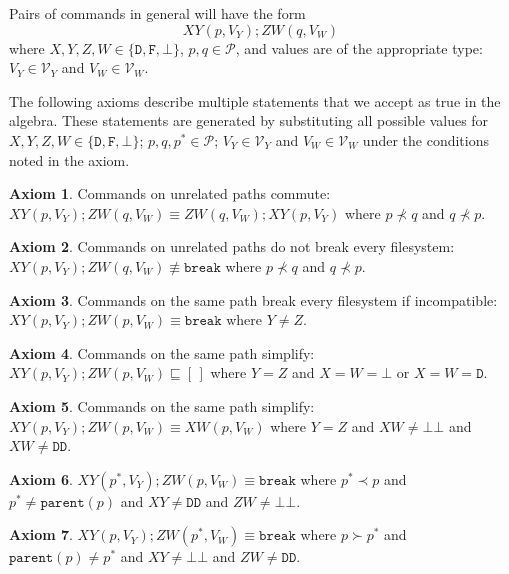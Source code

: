 \documentclass[12pt]{article}
\newcommand{\setvx}[1]{\mathcal{V}_{#1}}
\newcommand{\setp}{\mathcal{P}}
\newcommand{\empt}{\bot}
\newcommand{\parent}{\mathtt{parent}}
\newcommand{\pp}{p^*} %
\newcommand{\cbrk}{\mathtt{break}}
\newcommand{\fscommand}[2]{{#1#2}}
\newcommand{\fsregcommandchar}[1]{\mathtt{#1}}
\newcommand{\fsregcommand}[2]{\fscommand{\fsregcommandchar{#1}}{\fsregcommandchar{#2}}}
\newcommand{\cbb}{\fsregcommand{\empt}{\empt}}
\newcommand{\cdd}{\fsregcommand{D}{D}}
\newcommand{\cxy}{\fscommand{X}{Y}}
\newcommand{\cxw}{\fscommand{X}{W}}
\newcommand{\czw}{\fscommand{Z}{W}}
\newcommand{\typeset}{\{\fsregcommandchar{D},\fsregcommandchar{F},\empt\}}
\newcommand{\descendant}{\prec}
\newcommand{\ancestor}{\succ}
\newcommand{\eqext}{\sqsubseteq}
\newcommand{\nequiv}{\not\equiv}
\newcommand{\emptyseq}{[\,]}
\theoremstyle{definition}
\newtheorem{myax}{Axiom}
\begin{document}
Pairs of commands in general will have the form
\[ \cxy(p,V_Y); \czw(q,V_W) \]
where $X,Y,Z,W\in\typeset$, $p,q\in\setp$, 
and values are of the appropriate type: 
$V_Y\in\setvx{Y}$ and $V_W\in\setvx{W}$.

The following axioms describe multiple statements
that we accept as true in the algebra.
These statements are generated by substituting 
all possible values for
$X,Y,Z,W\in\typeset$; $p,q,\pp\in\setp$; $V_Y\in\setvx{Y}$ and $V_W\in\setvx{W}$
under the conditions noted in the axiom.


\begin{myax}\label{ax_separate_commute}
Commands on unrelated paths commute:
$\cxy(p,V_Y); \czw(q,V_W) \equiv \czw(q,V_W); \cxy(p,V_Y)$ where $p\not\descendant q$ and $q\not\descendant p$.
\end{myax}

\begin{myax}\label{ax_separate_nobreaks}
Commands on unrelated paths do not break every filesystem:
$\cxy(p,V_Y); \czw(q,V_W) \nequiv \cbrk$ where $p\not\descendant q$ and $q\not\descendant p$.
\end{myax}

\begin{myax}\label{ax_same_breaks}
Commands on the same path break every filesystem if incompatible:
$\cxy(p,V_Y); \czw(p,V_W) \equiv \cbrk$ where $Y\ne Z$.
\end{myax}

\begin{myax}\label{ax_same_emptyseq}
Commands on the same path simplify:
$\cxy(p,V_Y); \czw(p,V_W) \eqext \emptyseq$ where $Y=Z$ and $X=W=\fsregcommandchar{\empt}$ or $X=W=\fsregcommandchar{D}$.
\end{myax}

\begin{myax}\label{ax_same_singlec}
Commands on the same path simplify:
$\cxy(p,V_Y); \czw(p,V_W) \equiv \cxw(p,V_W)$ where $Y=Z$ and $XW\neq\cbb$ and $XW\neq\cdd$.
\end{myax}

\begin{myax}\label{ax_distantchild_breaks}
$\cxy(\pp,V_Y); \czw(p,V_W) \equiv \cbrk$ where $\pp\descendant p$ and $\pp\neq\parent(p)$ and $\cxy\neq\cdd$ and $\czw\neq\cbb$.
\end{myax}

\begin{myax}\label{ax_distantparent_breaks}
$\cxy(p,V_Y); \czw(\pp,V_W) \equiv \cbrk$ where $p\ancestor \pp$ and $\parent(p)\neq \pp$ and $\cxy\neq\cbb$ and $\czw\neq\cdd$.
\end{myax}
\end{document}
